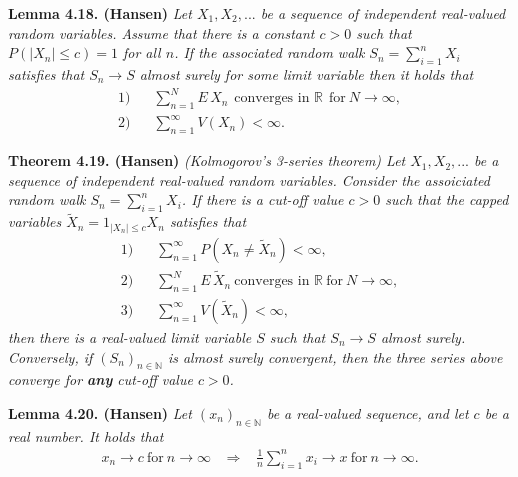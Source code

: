 \documentclass[
]{book}
\begin{document}
\textbf{Lemma 4.18. (Hansen)} \emph{Let \(X_1,X_2,...\) be a sequence of independent real-valued random variables. Assume that there is a constant \(c>0\) such that \(P(\vert X_n\vert \le c)=1\) for all \(n\). If the associated random walk \(S_n=\sum_{i=1}^n X_i\) satisfies that \(S_n\to S\) almost surely for some limit variable then it holds that}
\begin{align}
    \text{1)}\hspace{10pt}& \sum_{n=1}^NE\, X_n\hspace{5pt}\text{converges in }\mathbb{R}\hspace{5pt}\text{for}\ N\to \infty,\\
    \text{2)}\hspace{10pt}&\sum_{n=1}^\infty V(X_n)<\infty.
\end{align}

\textbf{Theorem 4.19. (Hansen)} \emph{(Kolmogorov's 3-series theorem) Let \(X_1,X_2,...\) be a sequence of independent real-valued random variables. Consider the assoiciated random walk \(S_n=\sum_{i=1}^n X_i\). If there is a cut-off value \(c>0\) such that the capped variables \(\tilde{X}_n=1_{\vert X_n\vert \le c}X_n\) satisfies that}
\begin{align*}
    \text{1)}\hspace{10pt}& \sum_{n=1}^\infty P(X_n\ne \tilde{X}_n)<\infty,\\
    \text{2)}\hspace{10pt}& \sum_{n=1}^N E\, \tilde{X}_n\ \text{converges in }\mathbb{R}\ \text{for}\ N\to \infty,\\
    \text{3)}\hspace{10pt}& \sum_{n=1}^\infty V(\tilde{X}_n)<\infty,
\end{align*}
\emph{then there is a real-valued limit variable \(S\) such that \(S_n\to S\) almost surely.}
\emph{Conversely, if \((S_n)_{n\in\mathbb{N}}\) is almost surely convergent, then the three series above converge for \textbf{any} cut-off value \(c>0\).}

\textbf{Lemma 4.20. (Hansen)} \emph{Let \((x_n)_{n\in\mathbb{N}}\) be a real-valued sequence, and let \(c\) be a real number. It holds that}
\begin{align*}
    x_n\to c\ \text{for}\ n\to \infty \hspace{10pt}\Rightarrow\hspace{10pt} \frac{1}{n}\sum_{i=1}^nx_i\to x\ \text{for}\ n\to\infty.
\end{align*}
\end{document}
